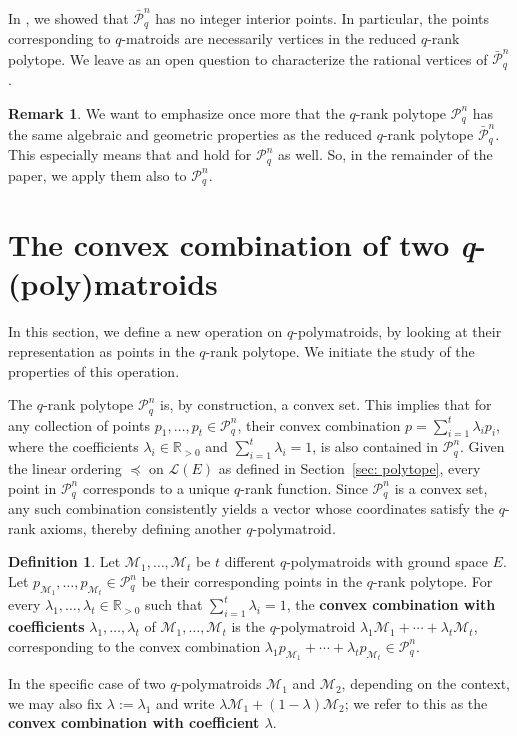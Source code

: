 \documentclass[a4paper,11pt,reqno]{amsart}
\theoremstyle{definition}
\newtheorem{definition}[theorem]{{{Definition}}}
\newtheorem{remark}[theorem]{{{Remark}}}
\newcommand{\mM}{\mathcal{M}}
\newcommand{\mL}{\mathcal{L}}
\newcommand{\R}{\mathbb R}
\newcommand{\rRP}{\bar{\mathcal{P}}_q^n}
\newcommand{\RP}{\mathcal{P}_q^n}
\begin{document}
{In , we showed that $\rRP$ has no integer interior points. In particular, the points corresponding to $q$-matroids are necessarily vertices in the reduced $q$-rank polytope. We leave as an open question to characterize the rational vertices of $\rRP$.

\begin{remark}
    We want to emphasize once more that the $q$-rank polytope $\RP$ has the same algebraic and geometric properties as the reduced $q$-rank polytope $\rRP$. This especially means that  and  hold for $\RP$ as well. So, in the remainder of the paper, we apply them also to $\RP$.
\end{remark}

\section{The convex combination of two \emph{q}-(poly)matroids}\label{sec: conv_combi}

In this section, we define a new operation on $q$-polymatroids, by looking at their representation as points in the $q$-rank polytope. We initiate the study of the properties of this operation.


The $q$-rank polytope $\RP$ is, by construction, a convex set. This implies that for any collection of points $p_1, \ldots, p_t \in \RP$, their convex combination $p = \sum\limits_{i=1}^t \lambda_i p_i$, where the coefficients $\lambda_i \in\R_{> 0}$ and $\sum\limits_{i=1}^t  \lambda_i = 1$, is also contained in $\RP$. Given the linear ordering $\preceq$ on $\mL(E)$ as defined in Section~\ref{sec: polytope}, every point in $\RP$ corresponds to a unique $q$-rank function. Since $\RP$ is a convex set, any such combination consistently yields a vector whose coordinates satisfy the $q$-rank axioms, thereby defining another $q$-polymatroid.



\begin{definition}\label{def: conv_combi}
    Let $\mM_1, \ldots, \mM_t$ be $t$ different $q$-polymatroids with ground space $E$. Let $p_{\mM_1}, \ldots, p_{\mM_t}\in \RP$  be their corresponding points in the $q$-rank polytope. For every $\lambda_1,\ldots,\lambda_t\in\R_{> 0}$ such that $\sum\limits_{i=1}^t\lambda_i=1$, the \textbf{convex combination with coefficients} $\lambda_1,\ldots, \lambda_t$ of $\mM_1, \ldots, \mM_t$ is the $q$-polymatroid $\lambda_1\mM_1 + \cdots +\lambda_t\mM_t$, corresponding to the convex combination $\lambda_1 p_{\mM_1}+\cdots+\lambda_tp_{\mM_t}\in\RP$.
    \end{definition}
    In the specific case of two $q$-polymatroids $\mathcal{M}_1$ and $\mathcal{M}_2$, depending on the context, we may also fix $\lambda := \lambda_1$ and write $\lambda\mathcal{M}_1 + (1-\lambda)\mathcal{M}_2$; we refer to this as the \textbf{convex combination with coefficient $\lambda$}.
    


}
\end{document}
